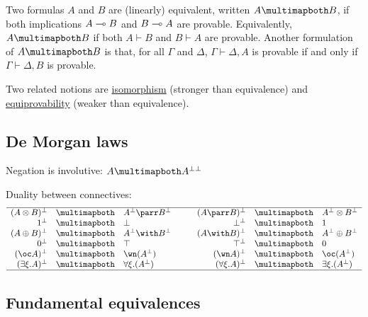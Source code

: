 Two formulas \(A\) and \(B\) are (linearly) equivalent, written
\(A\linequiv B\), if both implications \(A\multimap B\) and \(B\multimap A\) are
provable. Equivalently, \(A\linequiv B\) if both \(A\vdash B\) and
\(B\vdash A\) are provable. Another formulation of \(A\linequiv B\) is
that, for all \(\Gamma\) and \(\Delta\), \(\Gamma\vdash\Delta,A\) is
provable if and only if \(\Gamma\vdash\Delta,B\) is provable.

Two related notions are \hyperref[isomorphism]{isomorphism} (stronger than equivalence)
and \hyperref[equiprovability]{equiprovability} (weaker than equivalence).

\subsection{De Morgan laws}\label{de-morgan-laws}

Negation is involutive: \qquad \(A\linequiv A\biorth\)

Duality between connectives:
\begin{equation*}
\begin{array}{rclcrcl}
\hline
( A \tens B )\orth & \linequiv & A\orth \parr B\orth & \quad &
( A \parr B )\orth & \linequiv & A\orth \tens B\orth\\
\one\orth & \linequiv & \bot & & \bot\orth & \linequiv & \one\\
( A \plus B )\orth & \linequiv & A\orth \with B\orth & &
( A \with B )\orth & \linequiv & A\orth \plus B\orth\\
\zero\orth & \linequiv & \top & & \top\orth & \linequiv & \zero\\
( \oc A )\orth & \linequiv & \wn ( A\orth ) & &
( \wn A )\orth & \linequiv & \oc ( A\orth )\\
( \exists \xi.A )\orth & \linequiv & \forall \xi.( A\orth ) & &
( \forall \xi.A )\orth & \linequiv & \exists \xi.( A\orth )\\
\hline
\end{array}
\end{equation*}

\subsection{Fundamental equivalences}\label{fundamental-equivalences}

